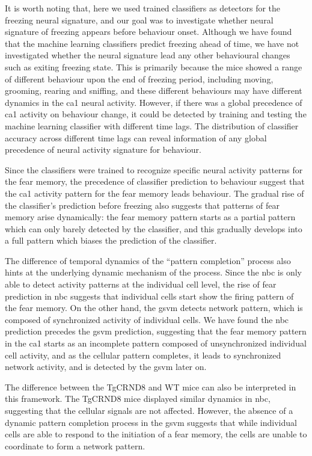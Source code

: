It is worth noting that, here we used trained classifiers as detectors for the freezing neural signature, and our goal was to investigate whether neural signature of freezing appears before behaviour onset. Although we have found that the machine learning classifiers predict freezing ahead of time, we have not investigated whether the neural signature lead any other behavioural changes such as exiting freezing state. This is primarily because the mice showed a range of different behaviour upon the end of freezing period, including moving, grooming, rearing and sniffing, and these different behaviours may have different dynamics in the \gls{ca1} neural activity. However, if there was a global precedence of \gls{ca1} activity on behaviour change, it could be detected by training and testing the machine learning classifier with different time lags. The distribution of classifier accuracy across different time lags can reveal information of any global precedence of neural activity signature for behaviour. 

Since the classifiers were trained to recognize specific neural activity patterns for the fear memory, the precedence of classifier prediction to behaviour suggest that the \gls{ca1} activity pattern for the fear memory leads behaviour. The gradual rise of the classifier's prediction before freezing also suggests that patterns of fear memory arise dynamically: the fear memory pattern starts as a partial pattern which can only barely detected by the classifier, and this gradually develops into a full pattern which biases the prediction of the classifier. 

The difference of temporal dynamics of the ``pattern completion'' process also hints at the underlying dynamic mechanism of the process. Since the \gls{nbc} is only able to detect activity patterns at the individual cell level, the rise of fear prediction in \gls{nbc} suggests that individual cells start show the firing pattern of the fear memory. On the other hand, the \gls{gsvm} detects network pattern, which is composed of synchronized activity of individual cells. We have found the \gls{nbc} prediction precedes the \gls{gsvm} prediction, suggesting that the fear memory pattern in the \gls{ca1} starts as an incomplete pattern composed of unsynchronized individual cell activity, and as the cellular pattern completes, it leads to synchronized network activity, and is detected by the \gls{gsvm} later on. 

The difference between the TgCRND8 and WT mice can also be interpreted in this framework. The TgCRND8 mice displayed similar dynamics in \gls{nbc}, suggesting that the cellular signals are not affected. However, the absence of a dynamic pattern completion process in the \gls{gsvm} suggests that while individual cells are able to respond to the initiation of a fear memory, the cells are unable to coordinate to form a network pattern. 

